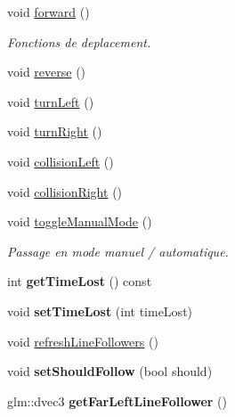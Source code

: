 \begin{DoxyCompactItemize}
\item 
void \hyperlink{group__inf2990_gafa5754bd3c4612519224e23f6afc78ff}{forward} ()
\begin{DoxyCompactList}\small\item\em Fonctions de deplacement. \end{DoxyCompactList}\item 
void \hyperlink{group__inf2990_ga33f628d3ada8ae939a648769e4573783}{reverse} ()
\item 
void \hyperlink{group__inf2990_ga792618ae4dc0d65f9d86c972d3b0d4a5}{turn\-Left} ()
\item 
void \hyperlink{group__inf2990_gafef0435e35696dcccf9b200b6df7913a}{turn\-Right} ()
\item 
void \hyperlink{group__inf2990_ga149d6f3dcca1da160fb96ff54640ae07}{collision\-Left} ()
\item 
void \hyperlink{group__inf2990_ga14b1c17d14b0a924108913c83ac23349}{collision\-Right} ()
\item 
\hypertarget{group__inf2990_ga7b2f749d78882a3ef67814b9e1659135}{void \hyperlink{group__inf2990_ga7b2f749d78882a3ef67814b9e1659135}{toggle\-Manual\-Mode} ()}\label{group__inf2990_ga7b2f749d78882a3ef67814b9e1659135}

\begin{DoxyCompactList}\small\item\em Passage en mode manuel / automatique. \end{DoxyCompactList}\item 
\hypertarget{class_noeud_robot_af3dacf553b94610b1e652abaa50c7231}{int {\bfseries get\-Time\-Lost} () const }\label{class_noeud_robot_af3dacf553b94610b1e652abaa50c7231}

\item 
\hypertarget{class_noeud_robot_a9b8a6d84382e7e5967b9491829a78d10}{void {\bfseries set\-Time\-Lost} (int time\-Lost)}\label{class_noeud_robot_a9b8a6d84382e7e5967b9491829a78d10}

\item 
void \hyperlink{group__inf2990_ga618e0871bd8fe677fe0c2b1cf1a1a8b7}{refresh\-Line\-Followers} ()
\item 
\hypertarget{class_noeud_robot_af82a65d9eb352e22d6ac1ffefb550d3f}{void {\bfseries set\-Should\-Follow} (bool should)}\label{class_noeud_robot_af82a65d9eb352e22d6ac1ffefb550d3f}

\item 
\hypertarget{class_noeud_robot_a613cdb2bb2f049e5dc5b055fd2f35c0f}{glm\-::dvec3 {\bfseries get\-Far\-Left\-Line\-Follower} ()}\label{class_noeud_robot_a613cdb2bb2f049e5dc5b055fd2f35c0f}


\end{DoxyCompactItemize}
